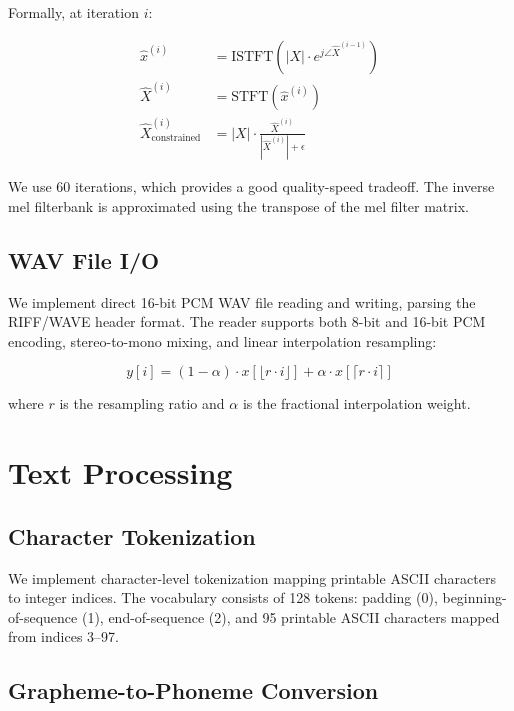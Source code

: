 \documentclass[conference]{IEEEtran}
\begin{document}
Formally, at iteration $i$:

\begin{align}
\hat{x}^{(i)} &= \text{ISTFT}\left(|X| \cdot e^{j\angle \hat{X}^{(i-1)}}\right) \\
\hat{X}^{(i)} &= \text{STFT}\left(\hat{x}^{(i)}\right) \\
\hat{X}^{(i)}_{\text{constrained}} &= |X| \cdot \frac{\hat{X}^{(i)}}{|\hat{X}^{(i)}| + \epsilon}
\end{align}

We use 60 iterations, which provides a good quality-speed tradeoff. The inverse mel filterbank is approximated using the transpose of the mel filter matrix.

\subsection{WAV File I/O}

We implement direct 16-bit PCM WAV file reading and writing, parsing the RIFF/WAVE header format. The reader supports both 8-bit and 16-bit PCM encoding, stereo-to-mono mixing, and linear interpolation resampling:

\begin{equation}
y[i] = (1 - \alpha) \cdot x[\lfloor r \cdot i \rfloor] + \alpha \cdot x[\lceil r \cdot i \rceil]
\end{equation}

where $r$ is the resampling ratio and $\alpha$ is the fractional interpolation weight.

\section{Text Processing}

\subsection{Character Tokenization}

We implement character-level tokenization mapping printable ASCII characters to integer indices. The vocabulary consists of 128 tokens: padding (0), beginning-of-sequence (1), end-of-sequence (2), and 95 printable ASCII characters mapped from indices 3--97.

\subsection{Grapheme-to-Phoneme Conversion}
\end{document}

